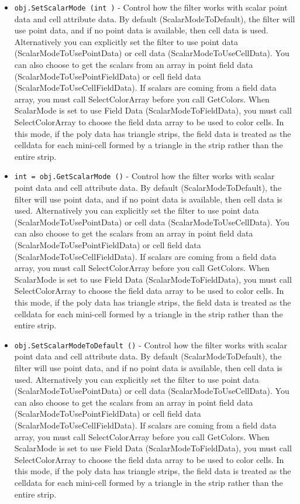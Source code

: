 \begin{itemize}
\item  \verb|obj.SetScalarMode (int )| -  Control how the filter works with scalar point data and cell attribute
 data.  By default (ScalarModeToDefault), the filter will use point data,
 and if no point data is available, then cell data is used. Alternatively
 you can explicitly set the filter to use point data
 (ScalarModeToUsePointData) or cell data (ScalarModeToUseCellData).
 You can also choose to get the scalars from an array in point field
 data (ScalarModeToUsePointFieldData) or cell field data
 (ScalarModeToUseCellFieldData).  If scalars are coming from a field
 data array, you must call SelectColorArray before you call
 GetColors.
 When ScalarMode is set to use Field Data (ScalarModeToFieldData), you 
 must call SelectColorArray to choose the field data array to be used to
 color cells. In this mode, if the poly data has triangle strips, 
 the field data is treated as the celldata for each mini-cell formed by
 a triangle in the strip rather than the entire strip.

\item  \verb|int = obj.GetScalarMode ()| -  Control how the filter works with scalar point data and cell attribute
 data.  By default (ScalarModeToDefault), the filter will use point data,
 and if no point data is available, then cell data is used. Alternatively
 you can explicitly set the filter to use point data
 (ScalarModeToUsePointData) or cell data (ScalarModeToUseCellData).
 You can also choose to get the scalars from an array in point field
 data (ScalarModeToUsePointFieldData) or cell field data
 (ScalarModeToUseCellFieldData).  If scalars are coming from a field
 data array, you must call SelectColorArray before you call
 GetColors.
 When ScalarMode is set to use Field Data (ScalarModeToFieldData), you 
 must call SelectColorArray to choose the field data array to be used to
 color cells. In this mode, if the poly data has triangle strips, 
 the field data is treated as the celldata for each mini-cell formed by
 a triangle in the strip rather than the entire strip.

\item  \verb|obj.SetScalarModeToDefault ()| -  Control how the filter works with scalar point data and cell attribute
 data.  By default (ScalarModeToDefault), the filter will use point data,
 and if no point data is available, then cell data is used. Alternatively
 you can explicitly set the filter to use point data
 (ScalarModeToUsePointData) or cell data (ScalarModeToUseCellData).
 You can also choose to get the scalars from an array in point field
 data (ScalarModeToUsePointFieldData) or cell field data
 (ScalarModeToUseCellFieldData).  If scalars are coming from a field
 data array, you must call SelectColorArray before you call
 GetColors.
 When ScalarMode is set to use Field Data (ScalarModeToFieldData), you 
 must call SelectColorArray to choose the field data array to be used to
 color cells. In this mode, if the poly data has triangle strips, 
 the field data is treated as the celldata for each mini-cell formed by
 a triangle in the strip rather than the entire strip.


\end{itemize}
